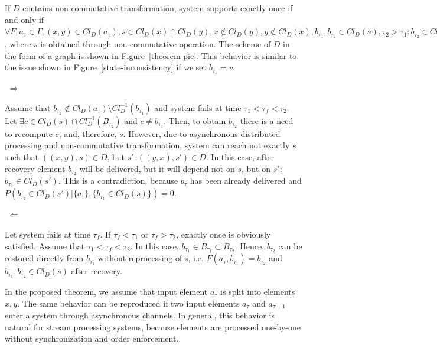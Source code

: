 \begin{theorem}
\label{necessary_conditions}
If $D$ contains non-commutative transformation, system supports exactly once if and only if $\forall F, a_\tau \in \Gamma, (x,y)\in Cl_D(a_\tau), s\in Cl_D(x) \cap Cl_D(y), x\notin Cl_D(y), y\notin Cl_D(x), b_{\tau_1}, b_{\tau_2} \in Cl_D(s), \tau_2 > \tau_1 : b_{\tau_2} \in Cl_D(a_\tau) \setminus Cl_D^{-1}(b_{\tau_1})$, where $s$ is obtained through non-commutative operation. The scheme of $D$ in the form of a graph is shown in Figure~\ref{theorem-pic}. This behavior is similar to the issue shown in Figure~\ref{state-inconsistency} if we set $b_{\tau_1}=v$.
\end{theorem}
\begin{sketch}
$ $\newline
$\Rightarrow$

Assume that $b_{\tau_2} \notin Cl_D(a_\tau) \setminus Cl^{-1}_D(b_{\tau_1})$ and system fails at time $\tau_1<\tau_f<\tau_2$. Let $\exists c \in Cl_D(s) \cap Cl^{-1}_D(B_{\tau_2})$ and $c\neq b_{\tau_1}$. Then, to obtain $b_{\tau_2}$ there is a need to recompute $c$, and, therefore, $s$. However, due to asynchronous distributed processing and non-commutative transformation, system can reach not exactly $s$ such that $((x,y), s) \in D$, but $s':((y,x),s')\in D$. In this case, after recovery element $b_{\tau_2}$ will be delivered, but it will depend not on $s$, but on $s'$: $b_{\tau_2}\in Cl_D(s')$. This is a contradiction, because $b_\tau$ has been already delivered and $P(b_{\tau_2}\in Cl_D(s')|\{a_\tau\},\{b_{\tau_1} \in Cl_D(s) \})=0$.

$ $\newline
$\Leftarrow$

Let system fails at time $\tau_f$. If $\tau_f < \tau_1$ or $\tau_f > \tau_2$, exactly once is obviously satisfied. Assume that $\tau_1<\tau_f<\tau_2$. In this case, $b_{\tau_1}\in B_{\tau_f}\subset B_{\tau_2}$. Hence, $b_{\tau_2}$ can be restored directly from $b_{\tau_1}$ without reprocessing of s, i.e. $F(a_\tau,b_{\tau_1})=b_{\tau_2}$ and $b_{\tau_1}, b_{\tau_2} \in Cl_D(s)$ after recovery.
\end{sketch}

In the proposed theorem, we assume that input element $a_\tau$ is split into elements $x,y$. The same behavior can be reproduced if two input elements $a_\tau$ and $a_{\tau+1}$ enter a system through asynchronous channels. In general, this behavior is natural for stream processing systems, because elements are processed one-by-one without synchronization and order enforcement. 

